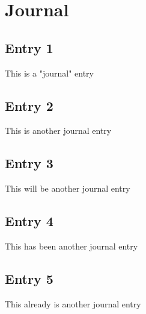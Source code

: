 \section{Journal}

\subsection{Entry 1}
This is a "journal" entry\autocite{huang_2013_malemale}
\subsection{Entry 2}
This is another journal entry\autocite{huang_2013_malemale}
\subsection{Entry 3}
This will be another journal entry\autocite{loos_2009_transnational}
\subsection{Entry 4}
This has been another journal entry\autocite{manuel_2020_how}
\subsection{Entry 5}
This already is another journal entry\autocite{huang_2013_malemale}
